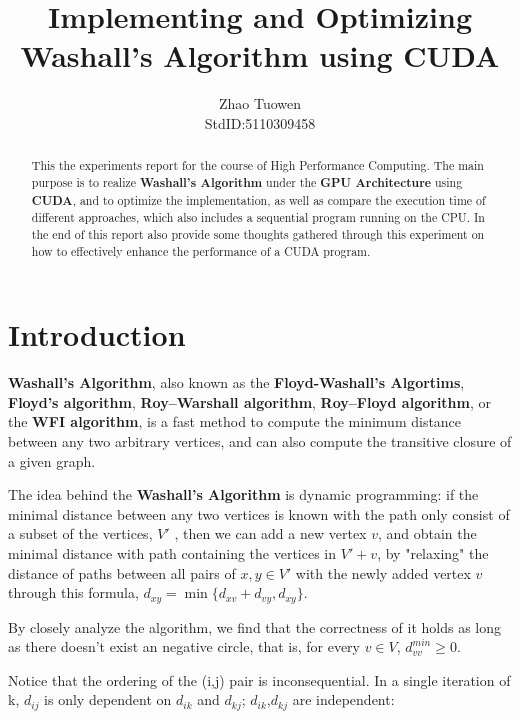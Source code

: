 \documentclass[12pt,a4paper]{article}
\newcommand{\keyword}[1]{{\bfseries \nobreakdash #1}}
\begin{document}
\title{Implementing and Optimizing Washall's Algorithm using CUDA}
\author{Zhao Tuowen\\
StdID:5110309458
}
\maketitle
\begin{abstract}

This the experiments report for the course of High Performance Computing. The main purpose is to realize \keyword{Washall's Algorithm} under the \keyword{GPU Architecture} using \keyword{CUDA}, and to optimize the implementation, as well as compare the execution time of different approaches, which also includes a sequential program running on the CPU. In the end of this report also provide some thoughts gathered through this experiment on how to effectively enhance the performance of a CUDA program.

\end{abstract}

\section{Introduction}

\keyword{Washall's Algorithm}, also known as the \keyword{Floyd-Washall's Algortims}, \keyword{Floyd's algorithm}, \keyword{Roy–Warshall algorithm}, \keyword{Roy–Floyd algorithm}, or the \keyword{WFI algorithm}, is a fast method to compute the minimum distance between any two arbitrary vertices, and can also compute the transitive closure of a given graph. 

The idea behind the \keyword{Washall's Algorithm} is dynamic programming: if the minimal distance between any two vertices is known with the path only consist of a subset of the vertices, $V'$ , then we can add a new vertex $v$, and obtain the minimal distance with path containing the vertices in $V'+v$, by "relaxing" the distance of paths between all pairs of $ x,y \in V' $ with the newly added vertex $v$ through this formula, $ d_{xy} = \min{\{d_{xv}+d_{vy},d_{xy}\}} $.

By closely analyze the algorithm, we find that the correctness of it holds as long as there doesn't exist an negative circle, that is, for every $ v \in V $, $d_{vv}^{min} \geq 0$.



Notice that the ordering of the (i,j) pair is inconsequential. In a single iteration of k, $d_{ij}$ is only dependent on $d_{ik}$ and $d_{kj}$; $d_{ik}$,$d_{kj}$ are independent:
\end{document}
